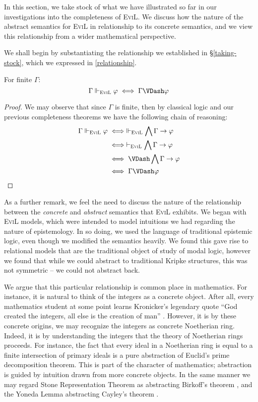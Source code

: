 In this section, we take stock of what we have illustrated so far in
our investigations into the completeness of \textsc{EviL}.  We discuss
how the nature of the abstract semantics for \textsc{EviL} in
relationship to its concrete semantics, and we view this relationship
from a wider mathematical perspective.

We shall begin by substantiating the relationship we established in
\S\ref{taking-stock}, which we expressed in \eqref{relationship}.

\begin{lemma} For finite $\Gamma$:
\[
\Gamma \Vdash_{\textsc{EviL}} \phi \iff \Gamma \VDash \phi
\]
\end{lemma}
\begin{proof}
We may observe that since $\Gamma$ is finite, then by classical logic
and our previous completeness theorems we have the following chain of reasoning:
\begin{align*}
  \Gamma \Vdash_{\textsc{EviL}} \phi & \iff  \Vdash_{\textsc{EviL}} \bigwedge \Gamma
  \to \phi \\
   & \iff \vdash_{\textsc{EviL}} \bigwedge \Gamma
  \to \phi \\
   & \iff \VDash \bigwedge \Gamma
  \to \phi \\
   & \iff  \Gamma \VDash \phi
\end{align*}
\end{proof}

As a further remark, we feel the need to discuss the nature of the
relationship between the \emph{concrete} and \emph{abstract} semantics
that \textsc{EviL} exhibits.  We began with \textsc{EviL} models,
which were intended to model intuitions we had regarding the nature of
epistemology.  In so doing, we used the language of traditional 
epistemic logic, even though we modified the semantics heavily.  We
found this gave rise to relational models that are the traditional
object of study of modal logic, however we found that while we could
abstract to traditional Kripke structures, this was not symmetric --
we could not abstract back.

We argue that this particular relationship is common place in
mathematics.  For instance, it is natural to think of the integers as
a concrete object.  After all, every mathematics student at some point
learns Kronicker's legendary quote ``God created the integers, all
else is the creation of man'' \cite[pg. 477]{bell_men_1986}.
However, it is by these concrete origins, we may recognize the
integers as concrete Noetherian ring.  Indeed, it is by understanding
the integers that the theory of Noetherian rings proceeds.  For
instance, the fact that every ideal in a Noetherian ring is equal to a finite
intersection of primary ideals is a pure abstraction of 
Euclid's prime decomposition theorem\cite[Lemmas 7.11 and 7.12,
pg. 83]{atiyah_introduction_1994}.  This is part of the character of
mathematics; abstraction is guided by intuition drawn from more
concrete objects.  In  the same manner we may regard Stone
Representation Theorem as abstracting
Birkoff's theorem \cite[chapters 11 and 5, respectively]{davey_introduction_2002}, and the Yoneda Lemma abstracting Cayley's
theorem \cite[chapters 4 and 1, respectively]{smith_post-modern_1999}.

